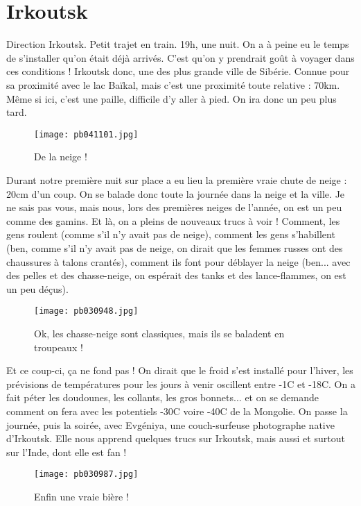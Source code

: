 \documentclass{book}
\begin{document}
\chapter{Irkoutsk}
Direction Irkoutsk. Petit trajet en train. 19h, une nuit. On a à peine eu le temps de s'installer qu'on était déjà arrivés. C'est qu'on y prendrait goût à voyager dans ces conditions !
Irkoutsk donc, une des plus grande ville de Sibérie. Connue pour sa proximité avec le lac Baïkal, mais c'est une proximité toute relative : 70km. Même si ici, c'est une paille, difficile d'y aller à pied. On ira donc un peu plus tard.


\begin{figure}[h]
\centering
\texttt{[image: pb041101.jpg]}
\caption*{ De la neige !}
\end{figure}

Durant notre première nuit sur place a eu lieu la première vraie chute de neige : 20cm d'un coup. On se balade donc toute la journée dans la neige et la ville. Je ne sais pas vous, mais nous, lors des premières neiges de l'année, on est un peu comme des gamins. Et là, on a pleins de nouveaux trucs à voir ! Comment, les gens roulent (comme s'il n'y avait pas de neige), comment les gens s'habillent (ben, comme s'il n'y avait pas de neige, on dirait que les femmes russes ont des chaussures à talons crantés), comment ils font pour déblayer la neige (ben... avec des pelles et des chasse-neige, on espérait des tanks et des lance-flammes, on est un peu déçus).


\begin{figure}[h]
\centering
\texttt{[image: pb030948.jpg]}
\caption*{ Ok, les chasse-neige sont classiques, mais ils se baladent en troupeaux !}
\end{figure}

Et ce coup-ci, ça ne fond pas ! On dirait que le froid s'est installé pour l'hiver, les prévisions de températures pour les jours à venir oscillent entre -1\textdegree C et -18\textdegree C. On a fait péter les doudounes, les collants, les gros bonnets... et on se demande comment on fera avec les potentiels -30\textdegree C voire -40\textdegree C de la Mongolie.
On passe la journée, puis la soirée, avec Evgéniya, une couch-surfeuse photographe native d'Irkoutsk. Elle nous apprend quelques trucs sur Irkoutsk, mais aussi et surtout sur l'Inde, dont elle est fan !


\begin{figure}[h]
\centering
\texttt{[image: pb030987.jpg]}
\caption*{ Enfin une vraie bière !}
\end{figure}
\end{document}
